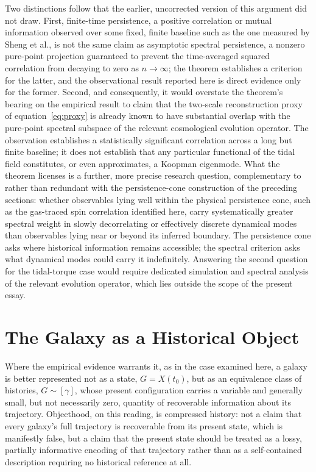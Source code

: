 \documentclass[11pt]{article}
\begin{document}
Two distinctions follow that the earlier, uncorrected version of this argument did not draw. First, finite-time persistence, a positive correlation or mutual information observed over some fixed, finite baseline such as the one measured by Sheng et al., is not the same claim as asymptotic spectral persistence, a nonzero pure-point projection guaranteed to prevent the time-averaged squared correlation from decaying to zero as $n \to \infty$; the theorem establishes a criterion for the latter, and the observational result reported here is direct evidence only for the former. Second, and consequently, it would overstate the theorem's bearing on the empirical result to claim that the two-scale reconstruction proxy of equation~\eqref{eq:proxy} is already known to have substantial overlap with the pure-point spectral subspace of the relevant cosmological evolution operator. The observation establishes a statistically significant correlation across a long but finite baseline; it does not establish that any particular functional of the tidal field constitutes, or even approximates, a Koopman eigenmode. What the theorem licenses is a further, more precise research question, complementary to rather than redundant with the persistence-cone construction of the preceding sections: whether observables lying well within the physical persistence cone, such as the gas-traced spin correlation identified here, carry systematically greater spectral weight in slowly decorrelating or effectively discrete dynamical modes than observables lying near or beyond its inferred boundary. The persistence cone asks where historical information remains accessible; the spectral criterion asks what dynamical modes could carry it indefinitely. Answering the second question for the tidal-torque case would require dedicated simulation and spectral analysis of the relevant evolution operator, which lies outside the scope of the present essay.

\section{The Galaxy as a Historical Object}

Where the empirical evidence warrants it, as in the case examined here, a galaxy is better represented not as a state, $G = X(t_0)$, but as an equivalence class of histories, $G \sim [\gamma]$, whose present configuration carries a variable and generally small, but not necessarily zero, quantity of recoverable information about its trajectory. Objecthood, on this reading, is compressed history: not a claim that every galaxy's full trajectory is recoverable from its present state, which is manifestly false, but a claim that the present state should be treated as a lossy, partially informative encoding of that trajectory rather than as a self-contained description requiring no historical reference at all.
\end{document}
